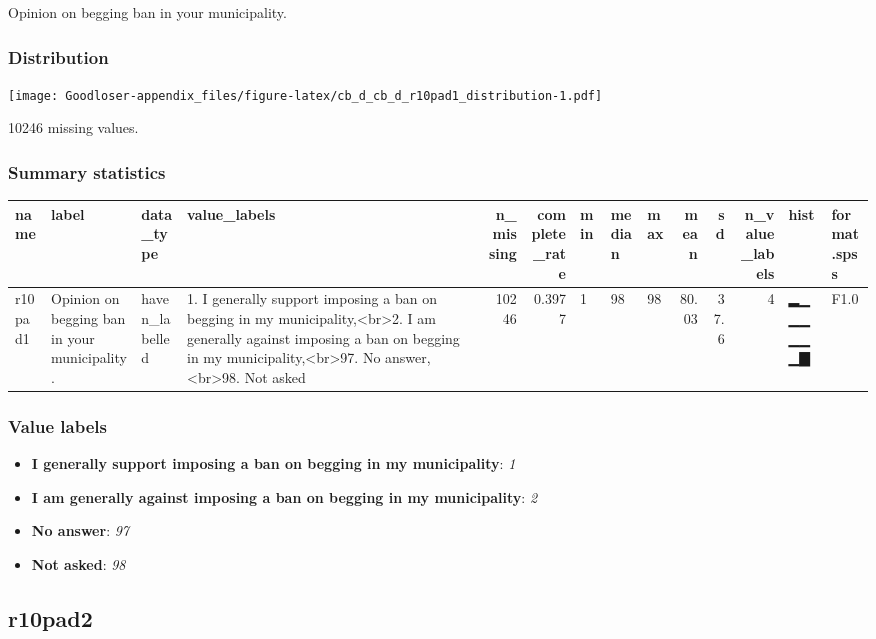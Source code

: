 \documentclass[
]{book}
\providecommand{\tightlist}{%
  \setlength{\itemsep}{0pt}\setlength{\parskip}{0pt}}
\begin{document}
Opinion on begging ban in your municipality.

\hypertarget{r10pad1_distribution}{%
\subsubsection{Distribution}\label{r10pad1_distribution}}

\texttt{[image: Goodloser-appendix\_files/figure-latex/cb\_d\_cb\_d\_r10pad1\_distribution-1.pdf]}

10246 missing values.

\hypertarget{r10pad1_summary}{%
\subsubsection{Summary statistics}\label{r10pad1_summary}}

\begin{tabular}{l|l|l|l|r|r|l|l|l|r|r|r|l|l}
\hline
name & label & data_type & value_labels & n_missing & complete_rate & min & median & max & mean & sd & n_value_labels & hist & format.spss\\
\hline
r10pad1 & Opinion on begging ban in your municipality. & haven_labelled & 1. I generally support imposing a ban on begging in my municipality,<br>2. I am generally against imposing a ban on begging in my municipality,<br>97. No answer,<br>98. Not asked & 10246 & 0.3977 & 1 & 98 & 98 & 80.03 & 37.6 & 4 & ▂▁▁▁▁▁▁▇ & F1.0\\
\hline
\end{tabular}

\hypertarget{r10pad1_labels}{%
\subsubsection{Value labels}\label{r10pad1_labels}}

\begin{itemize}
\tightlist
\item
  \textbf{I generally support imposing a ban on begging in my municipality}: \emph{1}
\item
  \textbf{I am generally against imposing a ban on begging in my municipality}: \emph{2}
\item
  \textbf{No answer}: \emph{97}
\item
  \textbf{Not asked}: \emph{98}
\end{itemize}

\hypertarget{r10pad2}{%
\subsection{r10pad2}\label{r10pad2}}
\end{document}
